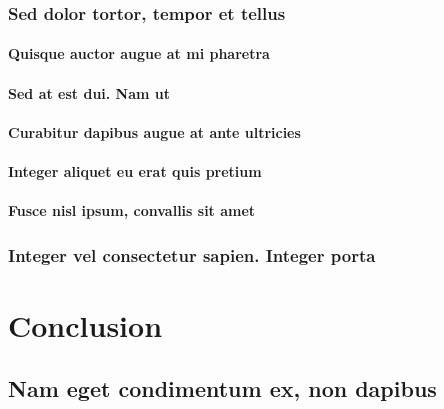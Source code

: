 \documentclass[%
  german,%
  exercise,%
  oneside,%
]{iswartcl}
\begin{document}
\subsection{Sed dolor tortor, tempor et tellus}

\lipsum[1-8]

\subsubsection{Quisque auctor augue at mi pharetra}

\lipsum[1-8]

\subsubsection{Sed at est dui. Nam ut}

\lipsum[1-8]

\subsubsection{Curabitur dapibus augue at ante ultricies}

\lipsum[1-8]

\subsubsection{Integer aliquet eu erat quis pretium}

\lipsum[1-8]

\subsubsection{Fusce nisl ipsum, convallis sit amet}

\lipsum[1-8]

\subsection{Integer vel consectetur sapien. Integer porta}

\lipsum[1-8]




\chapter{Conclusion}

\lipsum[1-8]

\section{Nam eget condimentum ex, non dapibus}
\end{document}
